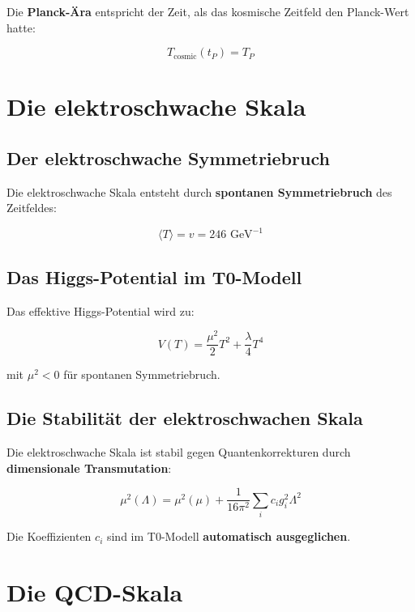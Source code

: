 \documentclass[12pt,a4paper]{report}
\begin{document}
	Die \textbf{Planck-Ära} entspricht der Zeit, als das kosmische Zeitfeld den Planck-Wert hatte:
	
	\begin{equation}
		T_{\text{cosmic}}(t_P) = T_P
	\end{equation}
	
	\section{Die elektroschwache Skala}
	
	\subsection{Der elektroschwache Symmetriebruch}
	
	Die elektroschwache Skala entsteht durch \textbf{spontanen Symmetriebruch} des Zeitfeldes:
	
	\begin{equation}
		\langle T\rangle = v = 246 \text{ GeV}^{-1}
	\end{equation}
	
	\subsection{Das Higgs-Potential im T0-Modell}
	
	Das effektive Higgs-Potential wird zu:
	
	\begin{equation}
		V(T) = \frac{\mu^2}{2}T^2 + \frac{\lambda}{4}T^4
	\end{equation}
	
	mit $\mu^2 < 0$ für spontanen Symmetriebruch.
	
	\subsection{Die Stabilität der elektroschwachen Skala}
	
	Die elektroschwache Skala ist stabil gegen Quantenkorrekturen durch \textbf{dimensionale Transmutation}:
	
	\begin{equation}
		\mu^2(\Lambda) = \mu^2(\mu) + \frac{1}{16\pi^2}\sum_i c_i g_i^2 \Lambda^2
	\end{equation}
	
	Die Koeffizienten $c_i$ sind im T0-Modell \textbf{automatisch ausgeglichen}.
	
	\section{Die QCD-Skala}
	
\end{document}
